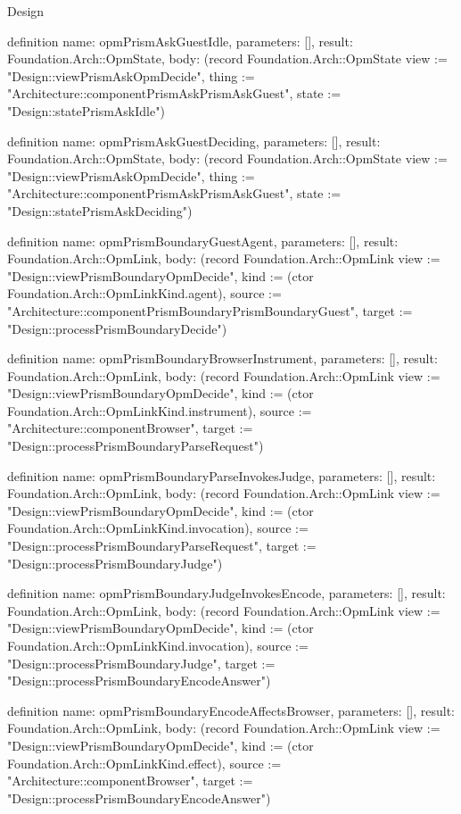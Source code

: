 \begin{lexlean}{Design}
\begin{semanticmodule}
definition{
  name: opmPrismAskGuestIdle,
  parameters: [],
  result: Foundation.Arch::OpmState,
  body: (record Foundation.Arch::OpmState {view := "Design::viewPrismAskOpmDecide", thing := "Architecture::componentPrismAskPrismAskGuest", state := "Design::statePrismAskIdle"})
}

definition{
  name: opmPrismAskGuestDeciding,
  parameters: [],
  result: Foundation.Arch::OpmState,
  body: (record Foundation.Arch::OpmState {view := "Design::viewPrismAskOpmDecide", thing := "Architecture::componentPrismAskPrismAskGuest", state := "Design::statePrismAskDeciding"})
}

definition{
  name: opmPrismBoundaryGuestAgent,
  parameters: [],
  result: Foundation.Arch::OpmLink,
  body: (record Foundation.Arch::OpmLink {view := "Design::viewPrismBoundaryOpmDecide", kind := (ctor Foundation.Arch::OpmLinkKind.agent), source := "Architecture::componentPrismBoundaryPrismBoundaryGuest", target := "Design::processPrismBoundaryDecide"})
}

definition{
  name: opmPrismBoundaryBrowserInstrument,
  parameters: [],
  result: Foundation.Arch::OpmLink,
  body: (record Foundation.Arch::OpmLink {view := "Design::viewPrismBoundaryOpmDecide", kind := (ctor Foundation.Arch::OpmLinkKind.instrument), source := "Architecture::componentBrowser", target := "Design::processPrismBoundaryParseRequest"})
}

definition{
  name: opmPrismBoundaryParseInvokesJudge,
  parameters: [],
  result: Foundation.Arch::OpmLink,
  body: (record Foundation.Arch::OpmLink {view := "Design::viewPrismBoundaryOpmDecide", kind := (ctor Foundation.Arch::OpmLinkKind.invocation), source := "Design::processPrismBoundaryParseRequest", target := "Design::processPrismBoundaryJudge"})
}

definition{
  name: opmPrismBoundaryJudgeInvokesEncode,
  parameters: [],
  result: Foundation.Arch::OpmLink,
  body: (record Foundation.Arch::OpmLink {view := "Design::viewPrismBoundaryOpmDecide", kind := (ctor Foundation.Arch::OpmLinkKind.invocation), source := "Design::processPrismBoundaryJudge", target := "Design::processPrismBoundaryEncodeAnswer"})
}

definition{
  name: opmPrismBoundaryEncodeAffectsBrowser,
  parameters: [],
  result: Foundation.Arch::OpmLink,
  body: (record Foundation.Arch::OpmLink {view := "Design::viewPrismBoundaryOpmDecide", kind := (ctor Foundation.Arch::OpmLinkKind.effect), source := "Architecture::componentBrowser", target := "Design::processPrismBoundaryEncodeAnswer"})
}


\end{semanticmodule}
\end{lexlean}
